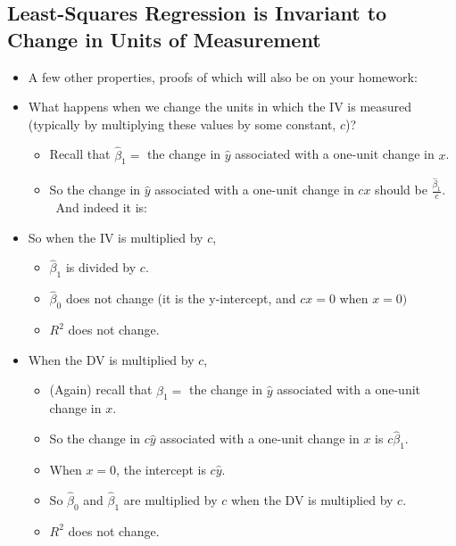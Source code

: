 \documentclass[11pt]{article}
\begin{document}
\subsection{Least-Squares Regression is Invariant to Change in Units of
Measurement}

\begin{itemize}
\item A few other properties, proofs of which will also be on your homework:

\item What happens when we change the units in which the IV is measured
(typically by multiplying these values by some constant, $c$)?

\begin{itemize}
\item Recall that $\widehat{\beta }_{1}=$ the change in $\widehat{y}$
associated with a one-unit change in $x$.

\item So the change in $\widehat{y}$ associated with a one-unit change in $%
cx $ should be $\frac{\widehat{\beta }_{1}}{c}.$ \ And indeed it is:
\end{itemize}

\item So when the IV is multiplied by $c$,

\begin{itemize}
\item $\widehat{\beta }_{1}$ is divided by $c$.

\item $\widehat{\beta }_{0}$ does not change (it is the y-intercept, and $%
cx=0$ when $x=0)$

\item $R^{2}$ does not change.
\end{itemize}

\item When the DV is multiplied by $c$,

\begin{itemize}
\item (Again) recall that $\widehat{\beta }_{1}=$ the change in $\widehat{y}$
associated with a one-unit change in $x$.

\item So the change in $c\widehat{y}$ associated with a one-unit change in $%
x $ is $c\widehat{\beta }_{1}.$

\item When $x=0$, the intercept is $c\widehat{y}$.

\item So $\widehat{\beta }_{0}$ and $\widehat{\beta }_{1}$ are multiplied by 
$c$ when the DV is multiplied by $c$.

\item $R^{2}$ does not change.
\end{itemize}
\end{itemize}
\end{document}
